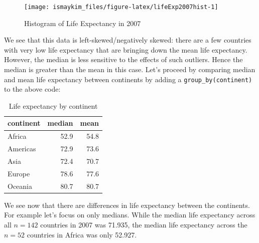 \documentclass[12pt, krantz2,]{krantz}
\makeatletter
\newenvironment{Shaded}{\begin{snugshade}}{\end{snugshade}}
\newcommand{\DataTypeTok}[1]{\textcolor[rgb]{0.27,0.27,0.27}{#1}}
\newcommand{\KeywordTok}[1]{\textcolor[rgb]{0.27,0.27,0.27}{\textbf{#1}}}
\newcommand{\NormalTok}[1]{#1}
\newcommand{\OperatorTok}[1]{\textcolor[rgb]{0.43,0.43,0.43}{\textbf{#1}}}
\newcommand{\StringTok}[1]{\textcolor[rgb]{0.5,0.5,0.5}{#1}}
\newenvironment{kframe}{%
\medskip{}
\setlength{\fboxsep}{.8em}
 \def\at@end@of@kframe{}%
 \ifinner\ifhmode%
  \def\at@end@of@kframe{\end{minipage}}%
  \begin{minipage}{\columnwidth}%
 \fi\fi%
 \def\FrameCommand##1{\hskip\@totalleftmargin \hskip-\fboxsep
 \colorbox{shadecolor}{##1}\hskip-\fboxsep
     \hskip-\linewidth \hskip-\@totalleftmargin \hskip\columnwidth}%
 \MakeFramed {\advance\hsize-\width
   \@totalleftmargin\z@ \linewidth\hsize
   \@setminipage}}%
 {\par\unskip\endMakeFramed%
 \at@end@of@kframe}
\renewenvironment{Shaded}{\begin{kframe}}{\end{kframe}}
\makeatother
\begin{document}
\begin{figure}

{\centering \texttt{[image: ismaykim\_files/figure-latex/lifeExp2007hist-1]} 

}

\caption{Histogram of Life Expectancy in 2007}\label{fig:lifeExp2007hist}
\end{figure}

We see that this data is left-skewed/negatively skewed: there are a few countries with very low life expectancy that are bringing down the mean life expectancy. However, the median is less sensitive to the effects of such outliers. Hence the median is greater than the mean in this case. Let's proceed by comparing median and mean life expectancy between continents by adding a \texttt{group\_by(continent)} to the above code:

\begin{Shaded}
\end{Shaded}

\begin{table}[t]

\caption{\label{tab:catxplot0}Life expectancy by continent}
\centering
\begin{tabular}{lrr}
\toprule
continent & median & mean\\
\midrule
Africa & 52.9 & 54.8\\
Americas & 72.9 & 73.6\\
Asia & 72.4 & 70.7\\
Europe & 78.6 & 77.6\\
Oceania & 80.7 & 80.7\\
\bottomrule
\end{tabular}
\end{table}

We see now that there are differences in life expectancy between the continents. For example let's focus on only medians. While the median life expectancy across all \(n = 142\) countries in 2007 was 71.935, the median life expectancy across the \(n =52\) countries in Africa was only 52.927.
\end{document}
